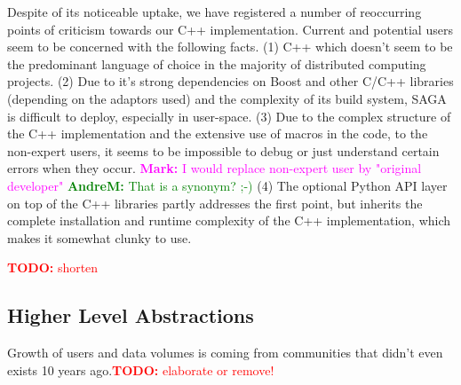 \documentclass[]{article}
\newcommand{\B}[1]{\textbf{#1}}
\newcommand{\todo}[1]{{\textcolor{red}{\B{TODO:} #1 }}}
\newcommand{\jhanote}[1]{{\textcolor{red}{     \B{Shantenu:} #1 }}}
\newcommand{\amnote}[1]{{\textcolor{green}{   \B{AndreM:  } #1 }}}
\newcommand{\ownote}[1]{{\textcolor{Brown}{   \B{Ole:     } #1 }}}
\newcommand{\msnote}[1]{{\textcolor{magenta}{ \B{Mark:    } #1 }}}
\newcommand{\jhanote}[1]{}
\newcommand{\amnote}[1]{}
\newcommand{\ownote}[1]{}
\newcommand{\msnote}[1]{}
\begin{document}
  Despite of its noticeable uptake, we have registered a number of
  reoccurring points of criticism towards our C++ implementation.
  Current and potential users seem to be concerned with the following
  facts. 
  (1) C++ which doesn't seem to be the predominant language of choice
  in the majority of distributed computing projects.
  (2) Due to it's strong dependencies on Boost and other C/C++
  libraries (depending on the adaptors used) and the complexity of its
  build system, SAGA is difficult to deploy, especially in user-space.
  (3) Due to the complex structure of the C++ implementation and the
  extensive use of macros in the code, to the non-expert users, it
  seems to be impossible to debug or just understand certain errors
  when they occur.  \msnote{I would replace non-expert user by
  "original developer"} \amnote{That is a synonym? ;-)}
  (4) The optional Python API layer on top of the C++ libraries partly
  addresses the first point, but inherits the complete installation
  and runtime complexity of the C++ implementation, which makes it
  somewhat clunky to use.

  \todo{shorten}


 \subsection{Higher Level Abstractions}




  Growth of users and data volumes is coming from communities that
  didn't even exists 10 years ago.\todo{elaborate or remove!}
 
\end{document}
